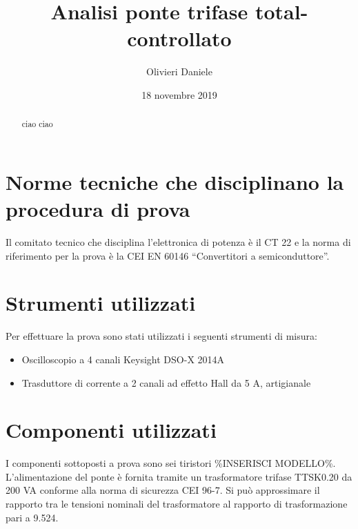 \documentclass[a4paper,10pt]{article}
\title{Analisi ponte trifase total-controllato}
\author{Olivieri Daniele}
\date{18 novembre 2019}
\begin{document}
\maketitle

\begin{abstract}
 ciao ciao
\end{abstract}

\section{Norme tecniche che disciplinano la procedura di prova}
Il comitato tecnico che disciplina l'elettronica di potenza è il CT 22 e la norma
di riferimento per la prova è la CEI EN 60146 ``Convertitori a semiconduttore''.

\section{Strumenti utilizzati}
Per effettuare la prova sono stati utilizzati i seguenti strumenti di misura:
\begin{itemize}
 \item Oscilloscopio a 4 canali Keysight DSO-X 2014A
 \item Trasduttore di corrente a 2 canali ad effetto Hall da 5 A, artigianale
\end{itemize}

\section{Componenti utilizzati}
I componenti sottoposti a prova sono sei tiristori \%INSERISCI MODELLO\%.
L'alimentazione del ponte è fornita tramite un trasformatore trifase TTSK0.20 da 
200 VA conforme alla norma di sicurezza CEI 96-7.
Si può approssimare il rapporto tra le tensioni nominali del trasformatore al 
rapporto di trasformazione pari a 9.524.
\end{document}
